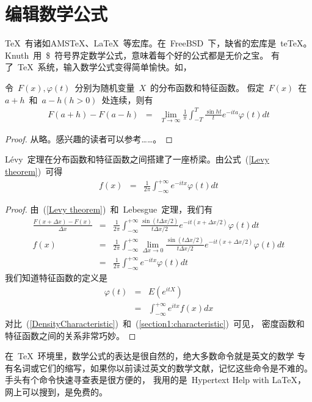 \documentclass[a4paper,11pt,         %
               twoside,              %
               ]{article}
\begin{document}
\section{编辑数学公式}
\indent   %
\TeX~有诸如AMS\TeX、\LaTeX~等宏库。在~FreeBSD~下，缺省的宏库是~te\TeX。
Knuth~用~\$~符号界定数学公式，意味着每个好的公式都是无价之宝。
有了~\TeX~系统，输入数学公式变得简单愉快。如，
\begin{theorem}[L\'{e}vy\index{L\'{e}vy~定理}]
令~$F(x),\varphi(t)$~分别为随机变量~$X$~的分布函数和特征函数。
假定~$F(x)$~在~$a+h$~和~$a-h (h>0)$~处连续，则有
\begin{eqnarray}
  \label{Levy theorem}  %
F(a+h)-F(a-h)&=&\lim_{T\rightarrow\infty} \frac{1}{\pi}\int^{T}_{-T} \frac{\sin ht}{t} e^{-ita} \varphi(t)dt
\end{eqnarray}
\end{theorem}
\begin{proof}
  从略。感兴趣的读者可以参考……。
\end{proof}
L\'{e}vy~定理在分布函数和特征函数之间搭建了一座桥梁。由公式~(\ref{Levy theorem})~可得
\begin{eqnarray}
  \label{DensityCharacteristic}   %
  f(x)&=&\frac{1}{2\pi}\int^{+\infty}_{-\infty} e^{-itx}\varphi(t)dt
\end{eqnarray}
\begin{proof}
由~(\ref{Levy theorem})~和~Lebesgue~定理，我们有
\begin{eqnarray}
  \frac{F(x+\Delta x)-F(x)}{\Delta x}&=&\frac{1}{2\pi} \int^{+\infty}_{-\infty}
\frac{\sin(t\Delta x/2)}{t\Delta x/2} e^{-it(x+\Delta x/2)} \varphi(t) dt\nonumber\\
  f(x)&=&\frac{1}{2\pi} \int^{+\infty}_{-\infty} \lim_{\Delta x\rightarrow 0}
\frac{\sin(t\Delta x/2)}{t\Delta x/2} e^{-it(x+\Delta x/2)} \varphi(t) dt\nonumber\\
  &=&\frac{1}{2\pi}\int^{+\infty}_{-\infty} e^{-itx}\varphi(t)dt\nonumber
\end{eqnarray}
我们知道特征函数的定义是
\begin{eqnarray}
  \label{section1:characteristic}   %
  \varphi(t)&=& E(e^{itX})\nonumber\\
            &=& \int^{+\infty}_{-\infty} e^{itx} f(x)dx
\end{eqnarray}
对比~(\ref{DensityCharacteristic})~和~(\ref{section1:characteristic})~可见，
密度函数和特征函数之间的关系非常巧妙。
\end{proof}
\HandRight 在~\TeX~环境里，数学公式的表达是很自然的，绝大多数命令就是英文的数学
专有名词或它们的缩写，如果你以前读过英文的数学文献，记忆这些命令是不难的。
手头有个命令快速寻查表是很方便的，
我用的是~Hypertext Help with \LaTeX，网上可以搜到，是免费的。
\end{document}
